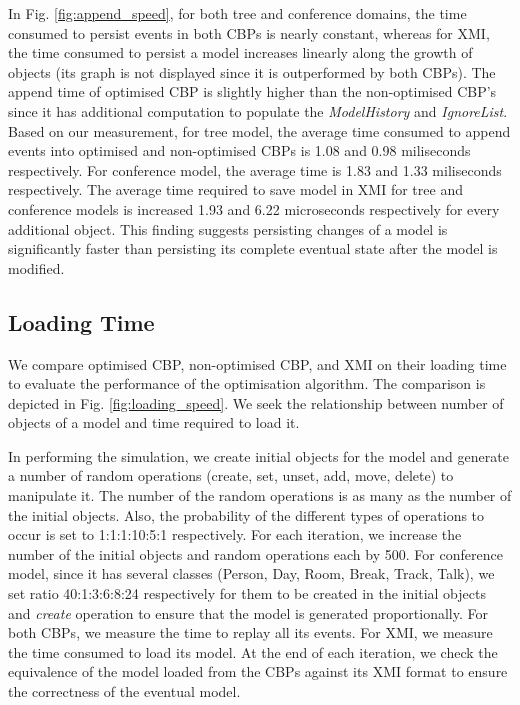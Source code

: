 \documentclass{llncs}
\begin{document}
In Fig. \ref{fig:append_speed}, for both tree and conference domains, the time consumed to persist events in both CBPs is nearly constant, whereas for XMI, the time consumed to persist a model increases linearly along the growth of objects (its graph is not displayed since it is outperformed by both CBPs). The append time of optimised CBP is slightly higher than the non-optimised CBP's since it has additional computation to populate the \emph{ModelHistory} and \emph{IgnoreList}. Based on our measurement, for tree model, the average time consumed to append events into optimised and non-optimised CBPs is 1.08 and 0.98 miliseconds respectively. For conference model, the average time is 1.83 and 1.33 miliseconds respectively. The average time required to save model in XMI for tree and conference models is increased 1.93 and 6.22 microseconds respectively for every additional object. This finding suggests persisting changes of a model is significantly faster than persisting its complete eventual state after the model is modified.    

\subsection{Loading Time}
\label{subsec:loading_time_test}
We compare optimised CBP, non-optimised CBP, and XMI on their loading time to evaluate the performance of the optimisation algorithm. The  comparison is depicted in Fig. \ref{fig:loading_speed}. We seek the relationship between number of objects of a model and time required to load it. 

In performing the simulation, we create initial objects for the model and generate a number of random operations (create, set, unset, add, move, delete) to manipulate it. The number of the random operations is as many as the number of the initial objects. Also, the probability of the different types of operations to occur is set to 1:1:1:10:5:1 respectively. For each iteration, we increase the number of the initial objects and random operations each by 500. For conference model, since it has several classes (Person, Day, Room, Break, Track, Talk), we set ratio 40:1:3:6:8:24 respectively for them to be created in the initial objects and \emph{create} operation to ensure that the model is generated proportionally. For both CBPs, we measure the time to replay all its events. For XMI, we measure the time consumed to load its model. At the end of each iteration, we check the equivalence of the model loaded from the CBPs against its XMI format to ensure the correctness of the eventual model.
\end{document}
